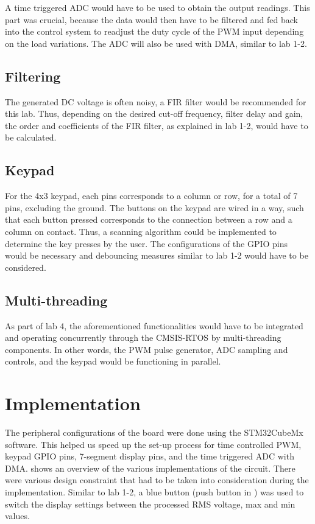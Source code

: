 \documentclass[a4paper,titlepage]{article}
\begin{document}
A time triggered ADC would have to be used to obtain the output readings. This part was crucial, because the data would then have to be filtered and fed back into the control system to readjust the duty cycle of the PWM input depending on the load variations. The ADC will also be used with DMA, similar to lab 1-2.
\subsection{Filtering}
The generated DC voltage is often noisy, a FIR filter would be recommended for this lab. Thus, depending on the desired cut-off frequency, filter delay and gain, the order and coefficients of the FIR filter, as explained in lab 1-2, would have to be calculated.
\subsection{Keypad}
For the 4x3 keypad, each pins corresponds to a column or row, for a total of 7 pins, excluding the ground. The buttons on the keypad are wired in a way, such that each button pressed corresponds to the connection between a row and a column on contact. Thus, a scanning algorithm could be implemented to determine the key presses by the user. The configurations of the GPIO pins would be necessary and debouncing measures similar to lab 1-2 would have to be considered.

\subsection{Multi-threading}
As part of lab 4, the aforementioned functionalities would have to be integrated and operating concurrently through the CMSIS-RTOS  by multi-threading components. In other words, the PWM pulse generator, ADC sampling and controls, and the keypad would be functioning in parallel.

\section{Implementation}
The peripheral configurations of the board were done using the STM32CubeMx software. This helped us speed up the set-up process for time controlled PWM, keypad GPIO pins, 7-segment display pins, and the time triggered ADC with DMA.  shows an overview of the various implementations of the circuit. There were various design constraint that had to be taken into consideration during the implementation.  Similar to lab 1-2, a blue button (push button in ) was used to switch the display settings between the processed RMS voltage, max and min values.
\end{document}
